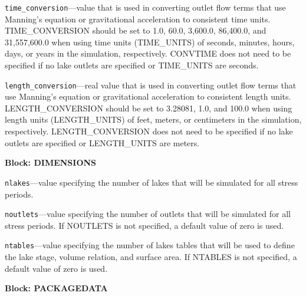\begin{description}
\item \texttt{time\_conversion}---value that is used in converting outlet flow terms that use Manning's equation or gravitational acceleration to consistent time units. TIME\_CONVERSION should be set to 1.0, 60.0, 3,600.0, 86,400.0, and 31,557,600.0 when using time units (TIME\_UNITS) of seconds, minutes, hours, days, or years in the simulation, respectively. CONVTIME does not need to be specified if no lake outlets are specified or TIME\_UNITS are seconds.

\item \texttt{length\_conversion}---real value that is used in converting outlet flow terms that use Manning's equation or gravitational acceleration to consistent length units. LENGTH\_CONVERSION should be set to 3.28081, 1.0, and 100.0 when using length units (LENGTH\_UNITS) of feet, meters, or centimeters in the simulation, respectively. LENGTH\_CONVERSION does not need to be specified if no lake outlets are specified or LENGTH\_UNITS are meters.

\end{description}
\item \textbf{Block: DIMENSIONS}

\begin{description}
\item \texttt{nlakes}---value specifying the number of lakes that will be simulated for all stress periods.

\item \texttt{noutlets}---value specifying the number of outlets that will be simulated for all stress periods. If NOUTLETS is not specified, a default value of zero is used.

\item \texttt{ntables}---value specifying the number of lakes tables that will be used to define the lake stage, volume relation, and surface area. If NTABLES is not specified, a default value of zero is used.

\end{description}
\item \textbf{Block: PACKAGEDATA}

